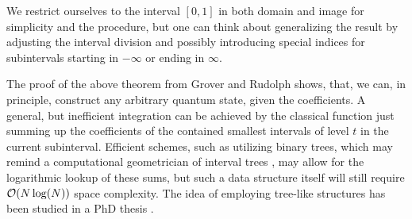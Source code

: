 We restrict ourselves to the interval \([0, 1]\) in both domain and image for simplicity and the procedure, but one can think about generalizing the result by adjusting the interval division and possibly introducing special indices for subintervals starting in \(-\infty\) or ending in \(\infty\).

\begin{remark}
    The proof of the above theorem from Grover and Rudolph shows, that, we can, in principle, construct any arbitrary quantum state, given the coefficients. A general, but inefficient integration can be achieved by the classical function just summing up the coefficients of the contained smallest intervals of level \(t\) in the current subinterval. Efficient schemes, such as utilizing binary trees, which may remind a computational geometrician of interval trees \cite[p. 220-226]{Berg2008}, may allow for the logarithmic lookup of these sums, but such a data structure itself will still require \(\operatorname{\mathcal{O}}(N \log(N))\) space complexity. The idea of employing tree-like structures has been studied in a PhD thesis \cite[pp. 23-27]{Dervovic2018}.
\end{remark}


